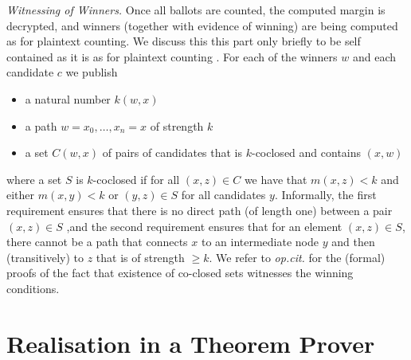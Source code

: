 \documentclass{llncs}
\begin{document}
\smallskip\noindent\emph{Witnessing of Winners.}
Once all ballots are counted, the computed margin is decrypted, and
winners (together with evidence of winning) are being computed as
for plaintext counting. We discuss this this part only briefly to be
self contained as it is as for plaintext counting
\cite{Pattinson:2017:SVE}. For each of the winners $w$ and each
candidate $c$ we publish
\begin{itemize}
\item a natural number $k(w, x)$
\item a path $w = x_0, \dots, x_n = x$ of strength $k$
\item a set $C(w, x)$ of pairs of candidates that is $k$-coclosed
and contains $(x, w)$
\end{itemize}
where a set $S$ is  $k$-coclosed if for all $(x,z) \in C$ we have
that $m(x, z) < k$ and either $m(x, y) < k$ or $(y,z) \in S$ for
all candidates $y$.  Informally, the first requirement ensures that
there is no direct path (of length one) between a pair $(x, z) \in
S$ ,and the second requirement ensures that for an element $(x, z)
\in S$, there cannot be a path that connects $x$ to an intermediate
node $y$ and then (transitively) to $z$ that is of strength $\geq
k$. 
We refer to \emph{op.cit.} for the (formal)
proofs of the fact that existence of co-closed sets witnesses the
winning conditions. 
  



\section{Realisation in a Theorem Prover}
\end{document}
